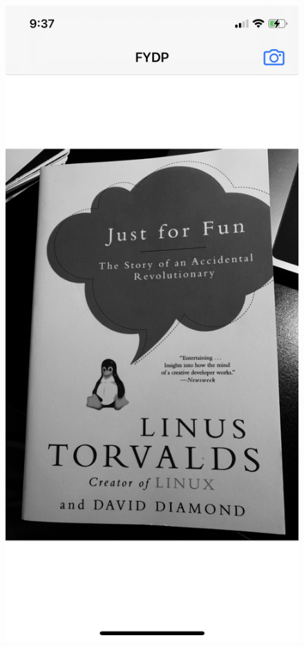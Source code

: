 \documentclass[a4paper,11pt]{article}
\begin{document}
\begin{figure}[H]
    \centering
    \includegraphics[width={0.25\linewidth}]{img/ios_test_app/testapp_bookcover.jpeg}

\end{figure}
\end{document}
